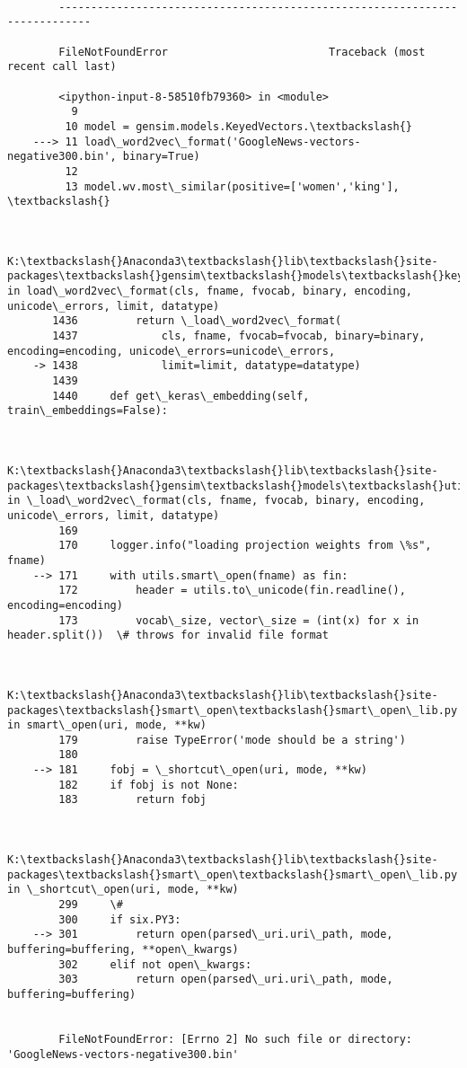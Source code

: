 \documentclass[11pt]{article}
\begin{document}
    \begin{Verbatim}[commandchars=\\\{\}]

        ---------------------------------------------------------------------------

        FileNotFoundError                         Traceback (most recent call last)

        <ipython-input-8-58510fb79360> in <module>
          9 
         10 model = gensim.models.KeyedVectors.\textbackslash{}
    ---> 11 load\_word2vec\_format('GoogleNews-vectors-negative300.bin', binary=True)
         12 
         13 model.wv.most\_similar(positive=['women','king'], \textbackslash{}
    

        K:\textbackslash{}Anaconda3\textbackslash{}lib\textbackslash{}site-packages\textbackslash{}gensim\textbackslash{}models\textbackslash{}keyedvectors.py in load\_word2vec\_format(cls, fname, fvocab, binary, encoding, unicode\_errors, limit, datatype)
       1436         return \_load\_word2vec\_format(
       1437             cls, fname, fvocab=fvocab, binary=binary, encoding=encoding, unicode\_errors=unicode\_errors,
    -> 1438             limit=limit, datatype=datatype)
       1439 
       1440     def get\_keras\_embedding(self, train\_embeddings=False):
    

        K:\textbackslash{}Anaconda3\textbackslash{}lib\textbackslash{}site-packages\textbackslash{}gensim\textbackslash{}models\textbackslash{}utils\_any2vec.py in \_load\_word2vec\_format(cls, fname, fvocab, binary, encoding, unicode\_errors, limit, datatype)
        169 
        170     logger.info("loading projection weights from \%s", fname)
    --> 171     with utils.smart\_open(fname) as fin:
        172         header = utils.to\_unicode(fin.readline(), encoding=encoding)
        173         vocab\_size, vector\_size = (int(x) for x in header.split())  \# throws for invalid file format
    

        K:\textbackslash{}Anaconda3\textbackslash{}lib\textbackslash{}site-packages\textbackslash{}smart\_open\textbackslash{}smart\_open\_lib.py in smart\_open(uri, mode, **kw)
        179         raise TypeError('mode should be a string')
        180 
    --> 181     fobj = \_shortcut\_open(uri, mode, **kw)
        182     if fobj is not None:
        183         return fobj
    

        K:\textbackslash{}Anaconda3\textbackslash{}lib\textbackslash{}site-packages\textbackslash{}smart\_open\textbackslash{}smart\_open\_lib.py in \_shortcut\_open(uri, mode, **kw)
        299     \#
        300     if six.PY3:
    --> 301         return open(parsed\_uri.uri\_path, mode, buffering=buffering, **open\_kwargs)
        302     elif not open\_kwargs:
        303         return open(parsed\_uri.uri\_path, mode, buffering=buffering)
    

        FileNotFoundError: [Errno 2] No such file or directory: 'GoogleNews-vectors-negative300.bin'

    \end{Verbatim}
\end{document}
